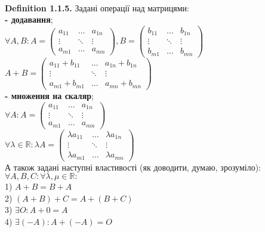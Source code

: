 \documentclass[a4paper, 10pt]{article}
\def\defin#1{\textbf{Definition {#1}}}
\theoremstyle{theoremdd}
\theoremstyle{theoremdd}
\theoremstyle{theoremdd}
\theoremstyle{theoremdd}
\theoremstyle{theoremdd}
\theoremstyle{theoremdd}
\theoremstyle{theoremdd}
\theoremstyle{theoremdd}
\begin{document}
    	\bigskip \\
    	\defin{1.1.5.} Задані операції над матрицями:\\
    	\textbf{- додавання};\\
    	$\forall A,B: A = \begin{pmatrix}
    	a_{11} & \dots & a_{1n} \\
    	\vdots & \ddots & \vdots \\
    	a_{m1} & \dots & a_{mn}
    	\end{pmatrix}, B = \begin{pmatrix}
    	b_{11} & \dots & b_{1n} \\
    	\vdots & \ddots & \vdots \\
    	b_{m1} & \dots & b_{mn}
    	\end{pmatrix}$\\
    	$A + B = \begin{pmatrix}
    	a_{11}+b_{11} & \dots & a_{1n} + b_{1n} \\
    	\vdots & \ddots & \vdots \\
    	a_{m1}+b_{m1} & \dots & a_{mn} + b_{mn}
    	\end{pmatrix}$
    	\bigskip \\
    	\textbf{- множення на скаляр};\\
    	$\forall A: A = \begin{pmatrix}
    	a_{11} & \dots & a_{1n} \\
    	\vdots & \ddots & \vdots \\
    	a_{m1} & \dots & a_{mn}
    	\end{pmatrix}$\\
    	$\forall \lambda \in \mathbb{R}: \lambda A = \begin{pmatrix}
    	\lambda a_{11} & \dots & \lambda a_{1n} \\
    	\vdots & \ddots & \vdots \\
    	\lambda a_{m1} & \dots & \lambda a_{mn}
    	\end{pmatrix}$
    	\bigskip \\
    	А також задані наступні властивості (як доводити, думаю, зрозуміло):\\
    	$\forall A,B,C: \forall \lambda,\mu \in \mathbb{R}:$\\
    	1) $A + B = B + A$\\
	2) $(A + B) + C = A + (B + C)$\\
	3) $\exists O: A + 0 = A$\\
	4) $\exists (-A): A + (-A) = O$\\
\end{document}
